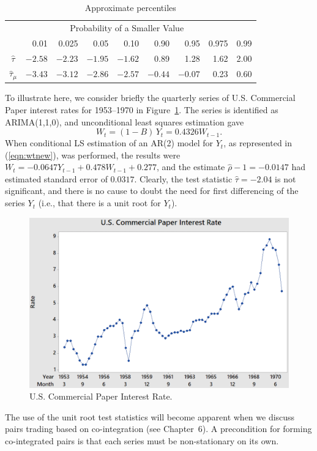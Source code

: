 	\begin{table}[!ht]
	\centering
	\caption{Approximate percentiles \label{tab:percentiles}}
	\begin{tabular}{crrrrrrrr}
	& \multicolumn{7}{c}{Probability of a Smaller Value} \\
	& 0.01 & 0.025 & 0.05 & 0.10 & 0.90 & 0.95 & 0.975 & 0.99 \\ \hline
	$\hat{\tau}$ & $-2.58$ & $-2.23$ & $-1.95$ & $-1.62$  &0.89 & 1.28 & 1.62 & 2.00 \\
	$\hat{\tau}_\mu$ & $-3.43$ & $-3.12$ & $-2.86$ & $-2.57$ & $-0.44$ & $-0.07$ & 0.23 & 0.60
	\end{tabular}
	\end{table}


\begin{ex} 
To illustrate here, we consider briefly the quarterly series of U.S. Commercial Paper interest rates for 1953--1970 in Figure~\ref{fig:exchrate}. The series is identified as ARIMA(1,1,0), and unconditional least squares estimation gave 
	\[
	W_t = (1 - B)\, Y_t = 0.4326 W_{t-1}.
	\]
When conditional LS estimation of an AR(2) model for $Y_t$, as represented in (\ref{eqn:wtnew}), was performed, the results were $W_t = -0.0647Y_{t-1} + 0.478 W_{t-1} + 0.277$, and the estimate $\hat{\rho} - 1 = -0.0147$ had estimated standard error of $0.0317$. Clearly, the test statistic $\hat{\tau} = -2.04$ is not significant, and there is no cause to doubt the need for first differencing of the series $Y_t$ (i.e., that there is a unit root for $Y_t$).
	\begin{figure}[!ht]
	\centering
	\includegraphics[width=\textwidth]{chapters/chapter_uvts/figures/uscompaper.png}
	\caption{U.S. Commercial Paper Interest Rate.\label{fig:exchrate}}
	\end{figure}
The use of the unit root test statistics will become apparent when we discuss pairs trading based on co-integration (see Chapter~6). A precondition for forming co-integrated pairs is that each series must be non-stationary on its own. 
\end{ex}


